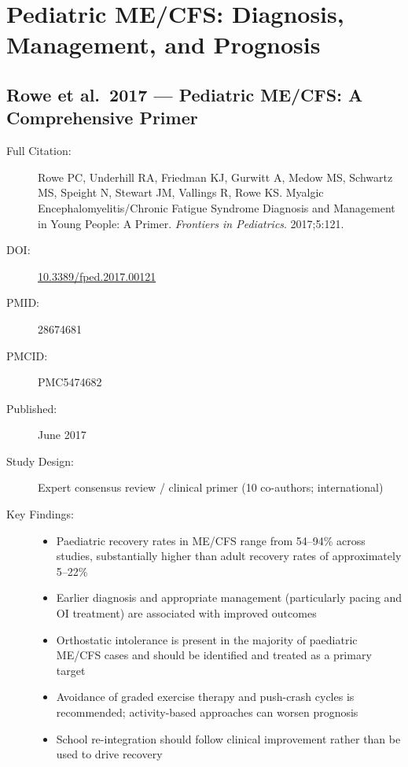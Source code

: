 \section{Pediatric ME/CFS: Diagnosis, Management, and Prognosis}
\label{sec:bib-pediatric-mecfs}

\subsection{Rowe et al.\ 2017 --- Pediatric ME/CFS: A Comprehensive Primer}

\begin{description}
    \item[Full Citation:] Rowe PC, Underhill RA, Friedman KJ, Gurwitt A, Medow MS, Schwartz MS, Speight N, Stewart JM, Vallings R, Rowe KS. Myalgic Encephalomyelitis/Chronic Fatigue Syndrome Diagnosis and Management in Young People: A Primer. \textit{Frontiers in Pediatrics}. 2017;5:121.
    \item[DOI:] \href{https://doi.org/10.3389/fped.2017.00121}{10.3389/fped.2017.00121}
    \item[PMID:] 28674681
    \item[PMCID:] PMC5474682
    \item[Published:] June 2017
    \item[Study Design:] Expert consensus review / clinical primer (10 co-authors; international)
    \item[Key Findings:]
    \begin{itemize}
        \item Paediatric recovery rates in ME/CFS range from 54--94\% across studies, substantially higher than adult recovery rates of approximately 5--22\%
        \item Earlier diagnosis and appropriate management (particularly pacing and OI treatment) are associated with improved outcomes
        \item Orthostatic intolerance is present in the majority of paediatric ME/CFS cases and should be identified and treated as a primary target
        \item Avoidance of graded exercise therapy and push-crash cycles is recommended; activity-based approaches can worsen prognosis
        \item School re-integration should follow clinical improvement rather than be used to drive recovery

\end{itemize}
\end{description}
